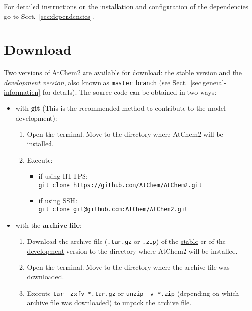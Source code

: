 For detailed instructions on the installation and configuration of the
dependencies go to Sect.~\ref{sec:dependencies}.

\section{Download} \label{sec:download}

Two versions of AtChem2 are available for download: the
\href{https://github.com/AtChem/AtChem2/releases}{stable version} and
the \emph{development version}, also known as \texttt{master\ branch}
(see Sect.~\ref{sec:general-information} for details). The source code
can be obtained in two ways:

\begin{itemize}
\item with \textbf{git} (This is the recommended method to contribute
  to the model development):
  \begin{enumerate}
  \item Open the terminal. Move to the directory where AtChem2 will be
    installed.
  \item Execute:
    \begin{itemize}
      \item if using HTTPS:\\
        \verb|git clone https://github.com/AtChem/AtChem2.git|
      \item if using SSH:\\
        \verb|git clone git@github.com:AtChem/AtChem2.git|
    \end{itemize}
  \end{enumerate}
\item with the \textbf{archive file}:
  \begin{enumerate}
  \item Download the archive file (\texttt{.tar.gz} or \texttt{.zip}) of the
    \href{https://github.com/AtChem/AtChem2/releases/}{stable} or of the
    \href{https://github.com/AtChem/AtChem2/archive/master.zip}{development}
    version to the directory where AtChem2 will be installed.
  \item Open the terminal. Move to the directory where the archive
    file was downloaded.
  \item Execute \verb|tar -zxfv *.tar.gz| or \verb|unzip -v *.zip|
    (depending on which archive file was downloaded) to unpack the
    archive file.
  \end{enumerate}
\end{itemize}

